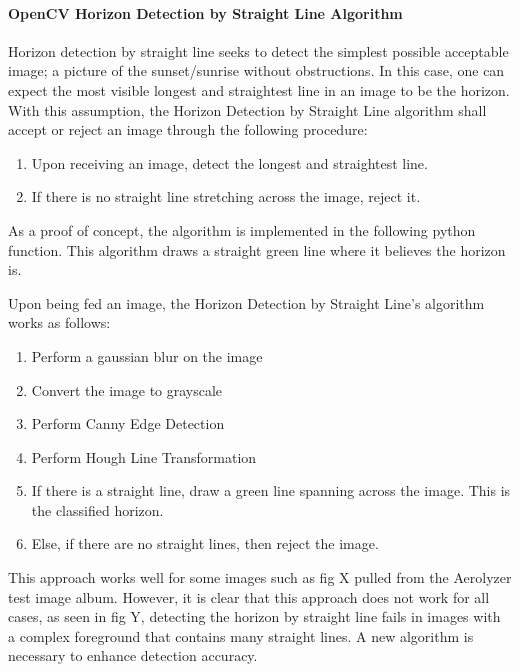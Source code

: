 \documentclass[onecolumn, draftclsnofoot,10pt, compsoc]{IEEEtran}
\begin{document}
\begin{singlespace}
      		\paragraph{OpenCV Horizon Detection by Straight Line Algorithm}
      			Horizon detection by straight line seeks to detect the simplest possible acceptable image; a picture of the sunset/sunrise without obstructions. In this case, one can expect the most visible longest and straightest line in an image to be the horizon. With this assumption, the Horizon Detection by Straight Line algorithm shall accept or reject an image through the following procedure:
      			\begin{enumerate}
      				\item Upon receiving an image, detect the longest and straightest line.
      				\item If there is no straight line stretching across the image, reject it.
      			\end{enumerate}
      			As a proof of concept, the algorithm is implemented in the following python function. This algorithm draws a straight green line where it believes the horizon is.
      			
     			
     			Upon being fed an image, the Horizon Detection by Straight Line’s algorithm works as follows:
				

				\begin{enumerate}
					\item Perform a gaussian blur on the image
					\item Convert the image to grayscale
					\item Perform Canny Edge Detection \cite{svm}
					\item Perform Hough Line Transformation \cite{svm}
					\item If there is a straight line, draw a green line spanning across the image. This is the classified horizon.
					\item Else, if there are no straight lines, then reject the image.
				\end{enumerate}


				This approach works well for some images such as fig X pulled from the Aerolyzer test image album. However, it is clear that this approach does not work for all cases, as seen in fig Y, detecting the horizon by straight line fails in images with a complex foreground that contains many straight lines. A new algorithm is necessary to enhance detection accuracy.


\end{singlespace}
\end{document}
